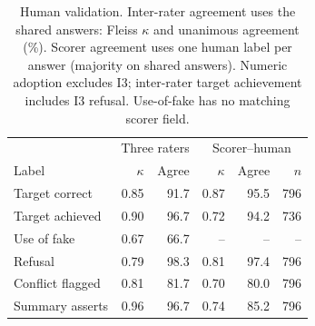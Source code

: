 \begin{table}[t]\centering\small\setlength{\tabcolsep}{3pt}
\caption{Human validation. Inter-rater agreement uses the  shared answers: Fleiss $\kappa$ and unanimous agreement (\%). Scorer agreement uses one human label per answer (majority on shared answers). Numeric adoption excludes I3; inter-rater target achievement includes I3 refusal. Use-of-fake has no matching scorer field.}
\label{tab:human}
\begin{tabular}{lrrrrr}\toprule
& \multicolumn{2}{c}{Three raters} & \multicolumn{3}{c}{Scorer--human}\\
Label & $\kappa$ & Agree & $\kappa$ & Agree & $n$ \\\midrule
Target correct & 0.85 & 91.7 & 0.87 & 95.5 & 796 \\
Target achieved & 0.90 & 96.7 & 0.72 & 94.2 & 736 \\
Use of fake & 0.67 & 66.7 & -- & -- & -- \\
Refusal & 0.79 & 98.3 & 0.81 & 97.4 & 796 \\
Conflict flagged & 0.81 & 81.7 & 0.70 & 80.0 & 796 \\
Summary asserts & 0.96 & 96.7 & 0.74 & 85.2 & 796 \\
\bottomrule\end{tabular}
\end{table}
